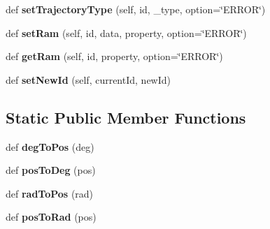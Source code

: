 \begin{DoxyCompactItemize}
\item 
def {\bfseries set\+Trajectory\+Type} (self, id, \+\_\+type, option=\char`\"{}E\+R\+R\+OR\char`\"{})\hypertarget{classkondoServoLib_1_1b3mCtrl_1_1B3mClass_a80d952179d4a163bf940327838295dd1}{}\label{classkondoServoLib_1_1b3mCtrl_1_1B3mClass_a80d952179d4a163bf940327838295dd1}

\item 
def {\bfseries set\+Ram} (self, id, data, property, option=\char`\"{}E\+R\+R\+OR\char`\"{})\hypertarget{classkondoServoLib_1_1b3mCtrl_1_1B3mClass_a3df6bc15e8c68b876ab9af208ee6ffb0}{}\label{classkondoServoLib_1_1b3mCtrl_1_1B3mClass_a3df6bc15e8c68b876ab9af208ee6ffb0}

\item 
def {\bfseries get\+Ram} (self, id, property, option=\char`\"{}E\+R\+R\+OR\char`\"{})\hypertarget{classkondoServoLib_1_1b3mCtrl_1_1B3mClass_a556267ec8a99ea44fce091c61d3c53b6}{}\label{classkondoServoLib_1_1b3mCtrl_1_1B3mClass_a556267ec8a99ea44fce091c61d3c53b6}

\item 
def {\bfseries set\+New\+Id} (self, current\+Id, new\+Id)\hypertarget{classkondoServoLib_1_1b3mCtrl_1_1B3mClass_ab8e85e88765bc5476e34bf2e9fa07527}{}\label{classkondoServoLib_1_1b3mCtrl_1_1B3mClass_ab8e85e88765bc5476e34bf2e9fa07527}

\end{DoxyCompactItemize}
\subsection*{Static Public Member Functions}
\begin{DoxyCompactItemize}
\item 
def {\bfseries deg\+To\+Pos} (deg)\hypertarget{classkondoServoLib_1_1b3mCtrl_1_1B3mClass_ab1c79f3b27609003cf8896b58b2aba5a}{}\label{classkondoServoLib_1_1b3mCtrl_1_1B3mClass_ab1c79f3b27609003cf8896b58b2aba5a}

\item 
def {\bfseries pos\+To\+Deg} (pos)\hypertarget{classkondoServoLib_1_1b3mCtrl_1_1B3mClass_ad0b48cf19eb33b2e9008c16ae8d49002}{}\label{classkondoServoLib_1_1b3mCtrl_1_1B3mClass_ad0b48cf19eb33b2e9008c16ae8d49002}

\item 
def {\bfseries rad\+To\+Pos} (rad)\hypertarget{classkondoServoLib_1_1b3mCtrl_1_1B3mClass_aacc7f359bec5b5117c187fb22e2417b6}{}\label{classkondoServoLib_1_1b3mCtrl_1_1B3mClass_aacc7f359bec5b5117c187fb22e2417b6}

\item 
def {\bfseries pos\+To\+Rad} (pos)\hypertarget{classkondoServoLib_1_1b3mCtrl_1_1B3mClass_a96ed8d1b0059d8523c0096e75aa3a352}{}\label{classkondoServoLib_1_1b3mCtrl_1_1B3mClass_a96ed8d1b0059d8523c0096e75aa3a352}

\end{DoxyCompactItemize}
